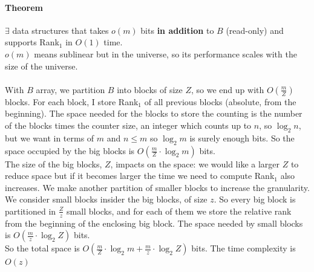 \documentclass[10pt]{report}
\begin{document}
\paragraph{Theorem} $\exists$ data structures that takes $o(m)$ bits \textbf{in addition} to $B$ (read-only) and supports Rank$_1$ in $O(1)$ time.\\
$o(m)$ means sublinear but in the universe, so its performance scales with the size of the universe.\\\\
With $B$ array, we partition $B$ into blocks of size $Z$, so we end up with $O\left(\frac{m}{Z}\right)$ blocks. For each block, I store Rank$_1$ of all previous blocks (absolute, from the beginning). The space needed for the blocks to store the counting is the number of the blocks times the counter size, an integer which counts up to $n$, so $\log_2 n$, but we want in terms of $m$ and $n\leq m$ so $\log_2 m$ is surely enough bits. So the space occupied by the big blocks is $O\left(\frac{m}{Z}\cdot \log_2 m\right)$ bits.\\
The size of the big blocks, $Z$, impacts on the space: we would like a larger $Z$ to reduce space but if it becomes larger the time we need to compute Rank$_1$ also increases. We make another partition of smaller blocks to increase the granularity. We consider small blocks insider the big blocks, of size $z$. So every big block is partitioned in $\frac{Z}{z}$ small blocks, and for each of them we store the relative rank from the beginning of the enclosing big block. The space needed by small blocks is $O\left(\frac{m}{z}\cdot\log_2 Z\right)$ bits.\\
So the total space is $O\left(\frac{m}{Z}\cdot\log_2 m + \frac{m}{z}\cdot\log_2 Z\right)$ bits. The time complexity is $O(z)$ 
\end{document}
